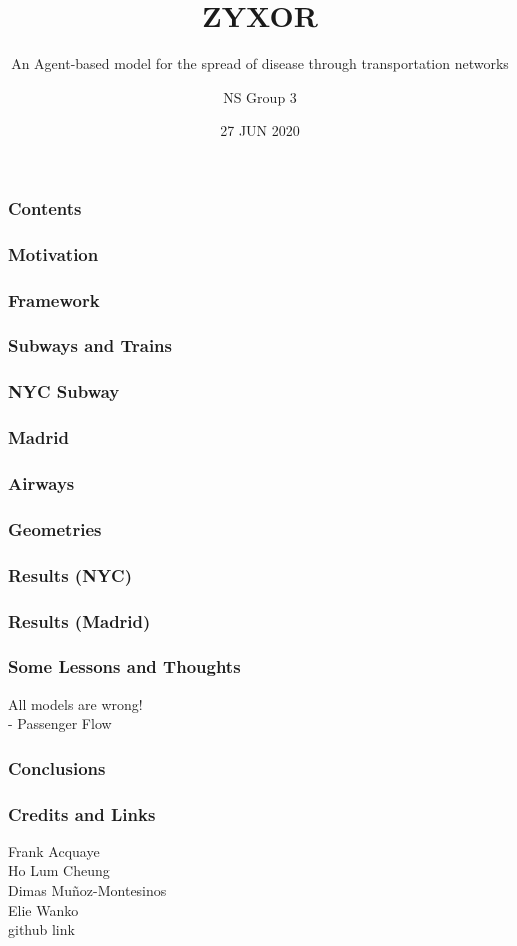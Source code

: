 \documentclass{beamer}
\begin{document}
\title{ZYXOR}
\subtitle{An Agent-based model for the spread of disease through transportation networks}
\author{NS Group 3}
\date{27 JUN 2020}
\begin{frame}
\titlepage
\end{frame}
\begin{frame}
\frametitle{Contents}
\end{frame}
\begin{frame}
\frametitle{Motivation}
\end{frame}
\begin{frame}
\frametitle{Framework}
\end{frame}
\begin{frame}
\frametitle{Subways and Trains}
\end{frame}
\begin{frame}
\frametitle{NYC Subway}
\end{frame}
\begin{frame}
\frametitle{Madrid}
\end{frame}
\begin{frame}
\frametitle{Airways}
\end{frame}
\begin{frame}
\frametitle{Geometries}
\end{frame}
\begin{frame}
\frametitle{Results (NYC)}
\end{frame}
\begin{frame}
\frametitle{Results (Madrid)}
\end{frame}
\begin{frame}
\frametitle{Some Lessons and Thoughts}
All models are wrong!\\
- Passenger Flow
\end{frame}
\begin{frame}
\frametitle{Conclusions}
\end{frame}
\begin{frame}
\frametitle{Credits and Links}
Frank Acquaye\\
Ho Lum Cheung\\
Dimas Muñoz-Montesinos\\
Elie Wanko\\
github link
\end{frame}
\end{document}
